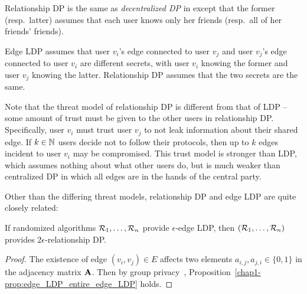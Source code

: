 Relationship DP is the same as \textit{decentralized DP} in \cite{Sun_CCS19} except that the former (resp.~latter) assumes that each user knows only her friends (resp.~all of her friends' friends).

Edge LDP assumes that 
user $v_i$'s edge connected to user $v_j$ 
and 
user $v_j$'s edge connected to user $v_i$ 
are different secrets, with user $v_i$ knowing the former and user $v_j$ knowing the latter. 
Relationship DP assumes that the two secrets are the same.

Note that 
the threat model of relationship DP is 
different from 
that of 
LDP -- 
some amount of trust must be given to the other users 
in relationship DP. 
Specifically, user $v_i$ must trust user $v_j$ to not leak information
about their shared edge. If $k \in \mathbb{N}$ users decide not to follow their protocols, 
then up to $k$ edges incident to user $v_i$ may be compromised. This trust model
is stronger than 
LDP, 
which assumes nothing about what other users 
do,
but is much weaker than centralized DP in which 
all edges are 
in the hands of the central party.

Other than the differing threat models, relationship DP and edge LDP are quite closely related:

\begin{proposition} \label{chap1-prop:edge_LDP_entire_edge_LDP} 
If randomized algorithms $\mathcal{R}_1, \ldots, \mathcal{R}_n$ provide $\epsilon$-edge LDP, 
then $(\mathcal{R}_1, \ldots, \mathcal{R}_n)$ provides $2\epsilon$-relationship DP.
\end{proposition}

\begin{proof}
The existence of edge $(v_i, v_j) \in E$ affects two elements $a_{i,j}, a_{j,i} \in \{0,1\}$ in the adjacency matrix $\mathbf{A}$. 
  Then by group privacy~\cite{DP}, Proposition~\ref{chap1-prop:edge_LDP_entire_edge_LDP} holds.
\end{proof}


